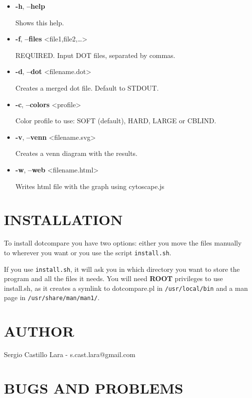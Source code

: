 \documentclass[10pt]{article}
\begin{document}
\begin{itemize}
\item
  \textbf{-h}, \textbf{--help}

  Shows this help.
\item
  \textbf{-f}, \textbf{--files}
  \textless{}file1,file2,\ldots{}\textgreater{}

  REQUIRED. Input DOT files, separated by commas.
\item
  \textbf{-d}, \textbf{--dot} \textless{}filename.dot\textgreater{}

  Creates a merged dot file. Default to STDOUT.
\item
  \textbf{-c}, \textbf{--colors} \textless{}profile\textgreater{}

  Color profile to use: SOFT (default), HARD, LARGE or CBLIND.
\item
  \textbf{-v}, \textbf{--venn} \textless{}filename.svg\textgreater{}

  Creates a venn diagram with the results.
\item
  \textbf{-w}, \textbf{--web} \textless{}filename.html\textgreater{}

  Writes html file with the graph using cytoscape.js
\end{itemize}

\section{INSTALLATION}\label{installation}

To install dotcompare you have two options: either you move the files
manually to wherever you want or you use the script \texttt{install.sh}.

If you use \texttt{install.sh}, it will ask you in which directory you
want to store the program and all the files it needs. You will need
\textbf{ROOT} privileges to use install.sh, as it creates a symlink to
dotcompare.pl in \texttt{/usr/local/bin} and a man page in
\texttt{/usr/share/man/man1/}.

\section{AUTHOR}\label{author}

Sergio Castillo Lara - s.cast.lara@gmail.com

\section{BUGS AND PROBLEMS}\label{bugs-and-problems}
\end{document}
